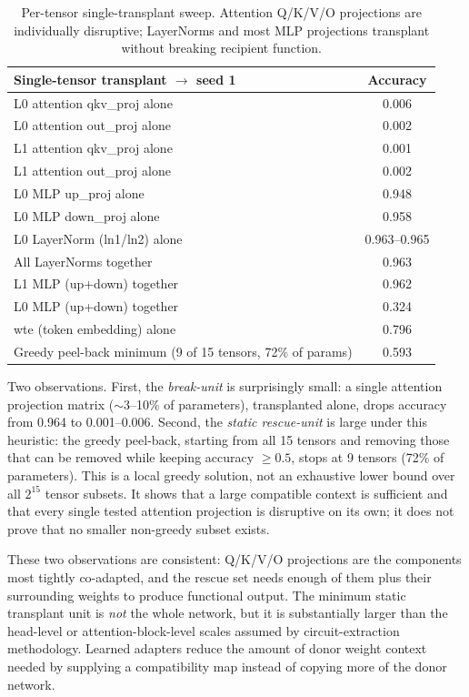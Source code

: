 \documentclass[final]{article}
\begin{document}
\begin{table}[h]
\centering
\caption{Per-tensor single-transplant sweep. Attention Q/K/V/O projections are
individually disruptive; LayerNorms and most MLP projections transplant
without breaking recipient function.}
\label{tab:minunit_sweep}
\begin{tabular}{lc}
\toprule
Single-tensor transplant $\to$ seed 1 & Accuracy \\
\midrule
L0 attention qkv\_proj alone  & 0.006 \\
L0 attention out\_proj alone  & 0.002 \\
L1 attention qkv\_proj alone  & 0.001 \\
L1 attention out\_proj alone  & 0.002 \\
L0 MLP up\_proj alone         & 0.948 \\
L0 MLP down\_proj alone       & 0.958 \\
L0 LayerNorm (ln1/ln2) alone  & 0.963--0.965 \\
All LayerNorms together       & 0.963 \\
L1 MLP (up+down) together     & 0.962 \\
L0 MLP (up+down) together     & 0.324 \\
wte (token embedding) alone   & 0.796 \\
\midrule
Greedy peel-back minimum (9 of 15 tensors, 72\% of params) & 0.593 \\
\bottomrule
\end{tabular}
\end{table}

Two observations. First, the \emph{break-unit} is surprisingly small: a single
attention projection matrix ($\sim$3--10\% of parameters), transplanted alone,
drops accuracy from 0.964 to 0.001--0.006. Second, the \emph{static
rescue-unit} is large under this heuristic: the greedy peel-back, starting from
all 15 tensors and removing those that can be removed while keeping accuracy
$\geq 0.5$, stops at 9 tensors (72\% of parameters). This is a local greedy
solution, not an exhaustive lower bound over all $2^{15}$ tensor subsets. It
shows that a large compatible context is sufficient and that every single
tested attention projection is disruptive on its own; it does not prove that no
smaller non-greedy subset exists.

These two observations are consistent: Q/K/V/O projections are the components
most tightly co-adapted, and the rescue set needs enough of them plus their
surrounding weights to produce functional output. The minimum static
transplant unit is \emph{not} the whole network, but it is substantially larger
than the head-level or attention-block-level scales assumed by
circuit-extraction methodology. Learned adapters reduce the amount of donor
weight context needed by supplying a compatibility map instead of copying more
of the donor network.
\end{document}
